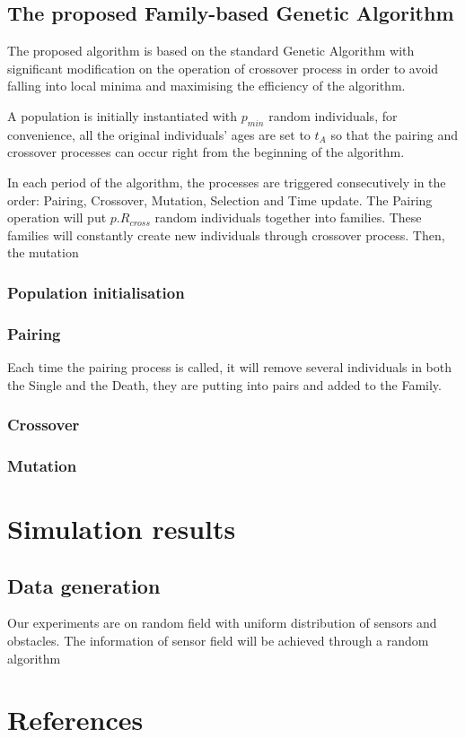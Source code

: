\documentclass[review]{elsarticle}
\begin{document}
\subsection{The proposed Family-based Genetic Algorithm}

The proposed algorithm is based on the standard Genetic Algorithm with significant modification on the operation of crossover process in order to avoid falling into local minima and maximising the efficiency of the algorithm.

A population is initially instantiated with $p_{min}$ random individuals, for convenience, all the original individuals' ages are set to $t_A$ so that the pairing and crossover processes can occur right from the beginning of the algorithm.

In each period of the algorithm, the processes are triggered consecutively in the  order: Pairing, Crossover, Mutation, Selection and Time update. The Pairing operation will put $p.R_{cross}$ random individuals together into families. These families will constantly create new individuals through crossover process. Then, the mutation

\subsubsection{Population initialisation}

\subsubsection{Pairing}

Each time the pairing process is called, it will remove several individuals in both the Single and the Death, they are putting into pairs and added to the Family. 

\subsubsection{Crossover}

\subsubsection{Mutation}

\section{Simulation results}

\subsection{Data generation}

Our experiments are on random field with uniform distribution of sensors and obstacles. The information of sensor field will be achieved through a random algorithm

\section*{References}


\end{document}
